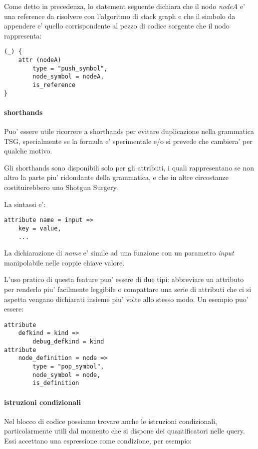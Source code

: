 Come detto in precedenza, lo statement seguente dichiara che il nodo \emph{nodeA} e' una reference da risolvere con l'algoritmo di stack graph e che il simbolo da appendere e' quello corrispondente al pezzo di codice sorgente che il nodo rappresenta:

\begin{Verbatim}[samepage=true]
(_) {
    attr (nodeA)
        type = "push_symbol",
        node_symbol = nodeA,
        is_reference
}
\end{Verbatim}

\paragraph{shorthands}
Puo' essere utile ricorrere a shorthands per evitare duplicazione nella grammatica TSG, specialmente se la formula e' sperimentale e/o si prevede che cambiera' per qualche motivo.

Gli shorthands sono disponibili solo per gli attributi, i quali rappresentano se non altro la parte piu' ridondante della grammatica, e che in altre circostanze costituirebbero uno Shotgun Surgery.

La sintassi e':

\begin{Verbatim}[samepage=true]
attribute name = input =>
    key = value,
    ...
\end{Verbatim}

La dichiarazione di \emph{name} e' simile ad una funzione con un parametro \emph{input} manipolabile nelle coppie chiave valore.

L'uso pratico di questa feature puo' essere di due tipi: abbreviare un attributo per renderlo piu' facilmente leggibile o compattare una serie di attributi che ci si aspetta vengano dichiarati insieme piu' volte allo stesso modo. Un esempio puo' essere:

\begin{Verbatim}[samepage=true]
attribute
    defkind = kind =>
        debug_defkind = kind
attribute
    node_definition = node =>
        type = "pop_symbol",
        node_symbol = node,
        is_definition
\end{Verbatim}

\paragraph{istruzioni condizionali}

Nel blocco di codice possiamo trovare anche le istruzioni condizionali, particolarmente utili dal momento che si dispone dei quantificatori nelle query.
Essi accettano una espressione come condizione, per esempio:


